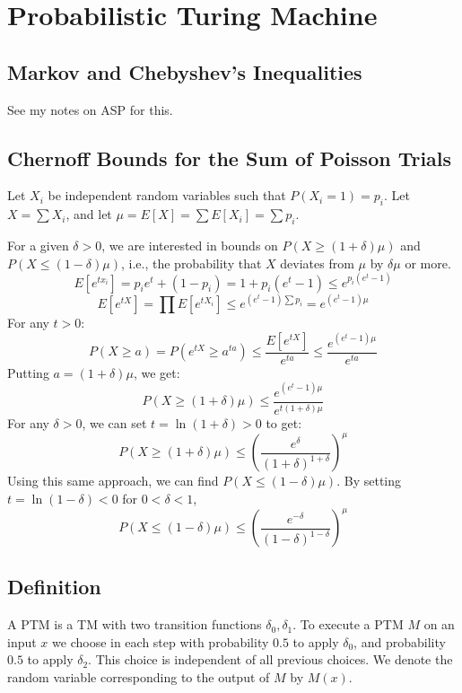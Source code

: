 \documentclass[12pt,letterpaper]{article}
\theoremstyle{definition}
\begin{document}
\section{Probabilistic Turing Machine}

\subsection{Markov and Chebyshev's Inequalities}

See my notes on ASP for this.

\subsection{Chernoff Bounds for the Sum of Poisson Trials}

Let $X_i$ be independent random variables such that $P(X_i=1) = p_i$. Let $X = \sum X_i$, and let $\mu = E[X] = \sum E[X_i] = \sum p_i$.

For a given $\delta > 0$, we are interested in bounds on $P(X \geq (1+\delta)\mu)$ and $P(X \leq (1 - \delta) \mu)$, i.e., the probability that $X$ deviates from $\mu$ by $\delta \mu$ or more.
\[E[e^{tx_i}] = p_i e^t + (1-p_i) = 1+p_i(e^t - 1) \leq e^{p_i(e^t-1)}\]
\[E[e^{tX}] = \prod E[e^{tX_i}] \leq e^{(e^t-1) \sum p_i} = e^{(e^t-1)\mu}\]
For any $t > 0$:
\[P(X \geq a) = P(e^{tX} \geq a^{ta}) \leq \frac{E[e^{tX}]}{e^{ta}} \leq \frac{e^{(e^t-1) \mu}}{e^{ta}}\]
Putting $a = (1+\delta) \mu$, we get:
\[P(X \geq (1+\delta) \mu) \leq \frac{e^{(e^t-1)\mu}}{e^{t(1+\delta)\mu}}\]
For any $\delta > 0$, we can set $t = \ln (1+\delta) > 0$ to get:
\[P(X \geq (1+\delta) \mu) \leq \left ( \frac{e^{\delta}}{(1+\delta)^{1+\delta}} \right)^\mu\]
Using this same approach, we can find $P(X \leq (1-\delta) \mu)$. By setting $t = \ln (1-\delta) < 0$ for $0 < \delta < 1$,
\[P(X \leq (1- \delta) \mu) \leq \left( \frac{e^{-\delta}}{(1-\delta)^{1-\delta}}\right)^\mu\]

\subsection{Definition}

A PTM is a TM with two transition functions $\delta_0, \delta_1$. To execute a PTM $M$ on an input $x$ we choose in each step with probability $0.5$ to apply $\delta_0$, and probability $0.5$ to apply $\delta_2$. This choice is independent of all previous choices. We denote the random variable corresponding to the output of $M$ by $M(x)$.
\end{document}
